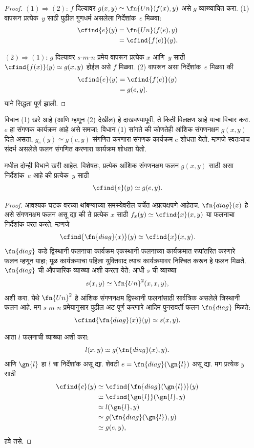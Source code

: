 \documentclass[../../../include/open-logic-section]{subfiles}
\begin{document}
\begin{proof}
$(1) \Rightarrow (2)$: $f$ दिल्यावर $g(x,y) \simeq
\fn{Un}(f(x),y)$ असे $g$ व्याख्यायित करा. (1) वापरून
प्रत्येक~$y$ साठी पुढील गुणधर्म असलेला निर्देशांक~$e$
मिळवा:
\begin{align*}
\cfind{e}(y) & = \fn{Un}(f(e),y) \\
& = \cfind{f(e)}(y).
\end{align*}

$(2) \Rightarrow (1)$: $g$ दिल्यावर $s$-$m$-$n$
प्रमेय वापरून प्रत्येक $x$ आणि~$y$ साठी
$\cfind{f(x)}(y) \simeq g(x,y)$ होईल असे $f$ मिळवा.
(2) वापरून असा निर्देशांक~$e$ मिळवा की
\begin{align*}
\cfind{e}(y) & = \cfind{f(e)}(y) \\
& = g(e,y).
\end{align*}
याने सिद्धता पूर्ण झाली.
\end{proof}

\begin{explain}
विधान (1) खरे आहे (आणि म्हणून (2) देखील) हे दाखवण्यापूर्वी,
ते किती विलक्षण आहे याचा विचार करा. $e$ हा संगणक
कार्यक्रम आहे असे समजा; विधान (1) सांगते की कोणतेही
आंशिक संगणनक्षम $g(x,y)$ दिले असता, $g_e(y) \simeq g(e,y)$
संगणित करणारा संगणक कार्यक्रम $e$ शोधता येतो. म्हणजे
स्वतःचाच संदर्भ असलेले फलन संगणित करणारा कार्यक्रम शोधता येतो.
\end{explain}

\begin{thm}
 मधील दोन्ही विधाने खरी आहेत.
विशेषतः, प्रत्येक आंशिक संगणनक्षम फलन $g(x,y)$ साठी
असा निर्देशांक~$e$ आहे की प्रत्येक~$y$ साठी
\[
\cfind{e}(y) \simeq g(e,y).
\]
\end{thm}

\begin{proof}
आवश्यक घटक वरच्या थांबण्याच्या समस्येवरील चर्चेत अप्रत्यक्षपणे
आहेतच. $\fn{diag}(x)$ हे असे संगणनक्षम फलन असू द्या की
ते प्रत्येक $x$ साठी $f_x(y) \simeq \cfind{x}(x,y)$
या फलनाचा निर्देशांक परत करते, म्हणजे
\[
\cfind{\fn{diag}(x)}(y) \simeq \cfind{x}(x,y).
\]
$\fn{diag}$ कडे द्विस्थानी फलनाचा कार्यक्रम एकस्थानी
फलनाच्या कार्यक्रमात रूपांतरित करणारे फलन म्हणून पाहा;
मूळ कार्यक्रमाचा पहिला युक्तिवाद त्याच कार्यक्रमावर निश्चित
करून हे फलन मिळते. $\fn{diag}$ ची औपचारिक व्याख्या अशी
करता येते: आधी $s$ ची व्याख्या
\[
s(x,y) \simeq \fn{Un}^2(x,x,y),
\]
अशी करा. येथे $\fn{Un}^2$ हे आंशिक
संगणनक्षम द्विस्थानी फलनांसाठी सार्वत्रिक असलेले त्रिस्थानी
फलन आहे. मग $s$-$m$-$n$ प्रमेयानुसार पुढील अट पूर्ण करणारे
आदिम पुनरावर्ती फलन $\fn{diag}$ मिळते:
\[
\cfind{\fn{diag}(x)}(y) \simeq s(x,y).
\]

आता $l$ फलनाची व्याख्या अशी करा:
\[
l(x,y) \simeq g(\fn{diag}(x),y).
\]
आणि $\gn{l}$ हा $l$ चा निर्देशांक असू द्या. शेवटी
$e = \fn{diag}(\gn{l})$ असू द्या. मग प्रत्येक $y$ साठी
\begin{align*}
\cfind{e}(y) & \simeq \cfind{\fn{diag}(\gn{l})}(y) \\
& \simeq \cfind{\gn{l}}(\gn{l}, y) \\
& \simeq l(\gn{l}, y) \\
& \simeq g(\fn{diag}(\gn{l}),y) \\
& \simeq g(e, y),
\end{align*}
हवे तसे.
\end{proof}
\end{document}

